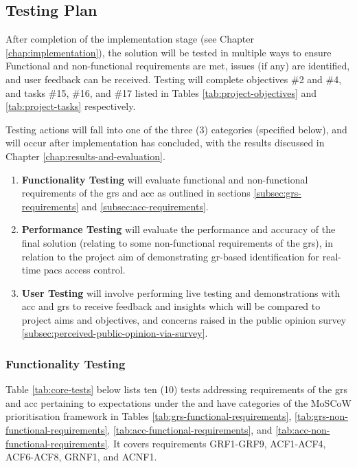 \subsection{Testing Plan}
\label{subsec:testing-plan}

After completion of the implementation stage (see Chapter \ref{chap:implementation}), the solution will be tested in multiple ways to ensure Functional and non-functional requirements are met, issues (if any) are identified, and user feedback can be received.
Testing will complete objectives \#2 and \#4, and tasks \#15, \#16, and \#17 listed in Tables \ref{tab:project-objectives} and \ref{tab:project-tasks} respectively.

Testing actions will fall into one of the three (3) categories (specified below), and will occur after implementation has concluded, with the results discussed in Chapter \ref{chap:results-and-evaluation}.

\begin{enumerate}
    \item \textbf{Functionality Testing} will evaluate functional and non-functional requirements of the \ac{grs} and \ac{acc} as outlined in sections \ref{subsec:grs-requirements} and \ref{subsec:acc-requirements}.
    \item \textbf{Performance Testing} will evaluate the performance and accuracy of the final solution (relating to some non-functional requirements of the \ac{grs}), in relation to the project aim of demonstrating \ac{gr}-based identification for real-time \ac{pacs} access control.
    \item \textbf{User Testing} will involve performing live testing and demonstrations with \ac{acc} and \ac{grs} to receive feedback and insights which will be compared to project aims and objectives, and concerns raised in the public opinion survey \ref{subsec:perceived-public-opinion-via-survey}.
\end{enumerate}

\subsubsection{Functionality Testing}
\label{subsec:functionality-testing-plan}

Table \ref{tab:core-tests} below lists ten (10) tests addressing requirements of the \ac{grs} and \ac{acc} pertaining to expectations under the  and  have categories of the MoSCoW prioritisation framework in Tables \ref{tab:grs-functional-requirements}, \ref{tab:grs-non-functional-requirements}, \ref{tab:acc-functional-requirements}, and \ref{tab:acc-non-functional-requirements}.
It covers requirements GRF1-GRF9, ACF1-ACF4, ACF6-ACF8, GRNF1, and ACNF1.

